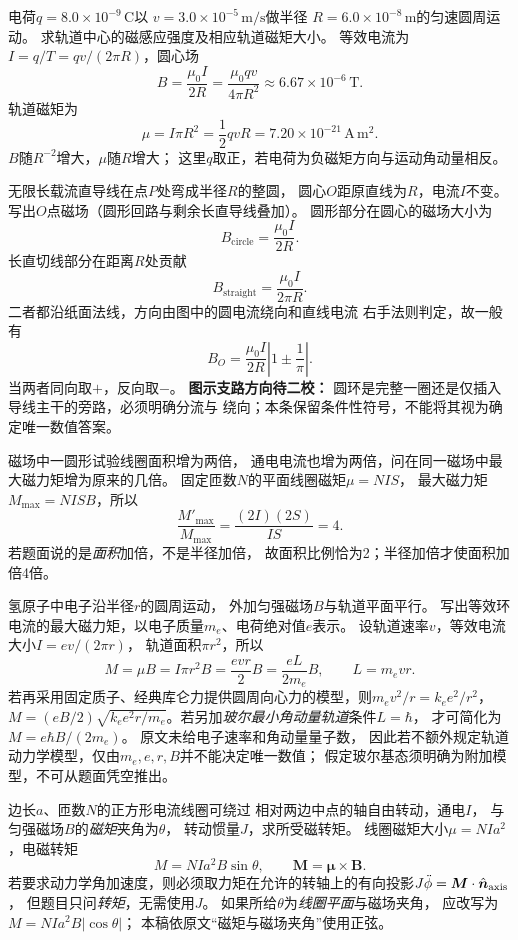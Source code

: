 \problemtext 电荷$q=8.0\times10^{-9}\,\mathrm C$以
$v=3.0\times10^{-5}\,\mathrm{m/s}$做半径
$R=6.0\times10^{-8}\,\mathrm m$的匀速圆周运动。
求轨道中心的磁感应强度及相应轨道磁矩大小。
\workings
等效电流为$I=q/T=qv/(2\pi R)$，圆心场
\[
\boxed{B=\frac{\mu_0I}{2R}
=\frac{\mu_0qv}{4\pi R^2}
\approx6.67\times10^{-6}\,\mathrm T}.
\]
轨道磁矩为
\[
\boxed{\mu=I\pi R^2=\frac12qvR
=7.20\times10^{-21}\,\mathrm{A\,m^2}}.
\]
\crosscheck $B$随$R^{-2}$增大，$\mu$随$R$增大；
这里$q$取正，若电荷为负磁矩方向与运动角动量相反。

\problemtext 无限长载流直导线在点$P$处弯成半径$R$的整圆，
圆心$O$距原直线为$R$，电流$I$不变。
写出$O$点磁场（圆形回路与剩余长直导线叠加）。
\workings
圆形部分在圆心的磁场大小为
\[
B_{\mathrm{circle}}=\frac{\mu_0I}{2R}.
\]
长直切线部分在距离$R$处贡献
\[
B_{\mathrm{straight}}=\frac{\mu_0I}{2\pi R}.
\]
二者都沿纸面法线，方向由图中的圆电流绕向和直线电流
右手法则判定，故一般有
\[
\boxed{B_O=\frac{\mu_0I}{2R}
\left|1\pm\frac1\pi\right|}.
\]
当两者同向取$+$，反向取$-$。
\crosscheck \textbf{图示支路方向待二校：}
圆环是完整一圈还是仅插入导线主干的旁路，必须明确分流与
绕向；本条保留条件性符号，不能将其视为确定唯一数值答案。

\problemtext 磁场中一圆形试验线圈面积增为两倍，
通电电流也增为两倍，问在同一磁场中最大磁力矩增为原来的几倍。
\workings
固定匝数$N$的平面线圈磁矩$\mu=NIS$，
最大磁力矩$M_{\max}=NISB$，所以
\[
\boxed{\frac{M'_{\max}}{M_{\max}}
=\frac{(2I)(2S)}{IS}=4}.
\]
\crosscheck 若题面说的是\emph{面积}加倍，不是半径加倍，
故面积比例恰为2；半径加倍才使面积加倍4倍。

\problemtext 氢原子中电子沿半径$r$的圆周运动，
外加匀强磁场$B$与轨道平面平行。
写出等效环电流的最大磁力矩，以电子质量$m_e$、电荷绝对值$e$表示。
\workings
设轨道速率$v$，等效电流大小$I=ev/(2\pi r)$，
轨道面积$\pi r^2$，所以
\[
\boxed{M=\mu B=I\pi r^2B
=\frac{evr}{2}B
=\frac{eL}{2m_e}B},
\qquad L=m_evr.
\]
若再采用固定质子、经典库仑力提供圆周向心力的模型，则$m_ev^2/r=k_e e^2/r^2$，$M=(eB/2)\sqrt{k_e e^2r/m_e}$。若另加\emph{玻尔最小角动量轨道}条件$L=\hbar$，
才可简化为$\boxed{M=e\hbar B/(2m_e)}$。
\crosscheck 原文未给电子速率和角动量量子数，
因此若不额外规定轨道动力学模型，仅由$m_e,e,r,B$并不能决定唯一数值；
假定玻尔基态须明确为附加模型，不可从题面凭空推出。

\problemtext 边长$a$、匝数$N$的正方形电流线圈可绕过
相对两边中点的轴自由转动，通电$I$，
与匀强磁场$B$的\emph{磁矩}夹角为$\theta$，
转动惯量$J$，求所受磁转矩。
\workings
线圈磁矩大小$\mu=NIa^2$，电磁转矩
\[
\boxed{M=NIa^2B\sin\theta},\qquad
\bm M=\bm\mu\times\bm B.
\]
若要求动力学角加速度，则必须取力矩在允许的转轴上的有向投影$J\ddot\phi=\bm M\cdot\hat{\bm n}_{\rm axis}$，
但题目只问\emph{转矩}，无需使用$J$。
\crosscheck 如果所给$\theta$为\emph{线圈平面}与磁场夹角，
应改写为$M=NIa^2B|\cos\theta|$；
本稿依原文“磁矩与磁场夹角”使用正弦。

